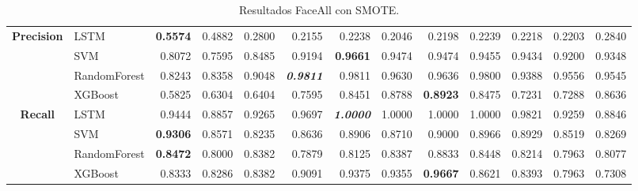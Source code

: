 \begin{table}[H]
\begin{adjustbox}{max width=14cm}
\begin{tabular}{|c|l|r|r|r|r|r|r|r|r|r|r|r|}
			\hline
			\textbf{Precision} & LSTM &  \textbf{0.5574} &  0.4882 &  0.2800 &  0.2155 &  0.2238 &  0.2046 &  0.2198 &  0.2239 &  0.2218 &  0.2203 &  0.2840 \\
			& SVM &  0.8072 &  0.7595 &  0.8485 &  0.9194 &  \textbf{0.9661} &  0.9474 &  0.9474 &  0.9455 &  0.9434 &  0.9200 &  0.9348 \\
			& RandomForest &  0.8243 &  0.8358 &  0.9048 &  \textit{\textbf{0.9811}} &  0.9811 &  0.9630 &  0.9636 &  0.9800 &  0.9388 &  0.9556 &  0.9545 \\
			& XGBoost &  0.5825 &  0.6304 &  0.6404 &  0.7595 &  0.8451 &  0.8788 &  \textbf{0.8923} &  0.8475 &  0.7231 &  0.7288 &  0.8636 \\
			\hline
			\textbf{Recall} & LSTM &  0.9444 &  0.8857 &  0.9265 &  0.9697 &  \textit{\textbf{1.0000}} &  1.0000 &  1.0000 &  1.0000 &  0.9821 &  0.9259 &  0.8846 \\
			& SVM &  \textbf{0.9306} &  0.8571 &  0.8235 &  0.8636 &  0.8906 &  0.8710 &  0.9000 &  0.8966 &  0.8929 &  0.8519 &  0.8269 \\
			& RandomForest &  \textbf{0.8472} &  0.8000 &  0.8382 &  0.7879 &  0.8125 &  0.8387 &  0.8833 &  0.8448 &  0.8214 &  0.7963 &  0.8077 \\
			& XGBoost &  0.8333 &  0.8286 &  0.8382 &  0.9091 &  0.9375 &  0.9355 &  \textbf{0.9667} &  0.8621 &  0.8393 &  0.7963 &  0.7308 \\
			\hline
		\end{tabular}
	\end{adjustbox}
	\caption{Resultados FaceAll con SMOTE.}
	\label{tab:faceAllSMOTE}
\end{table}

